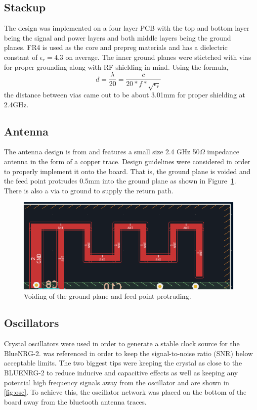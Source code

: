 \documentclass[12pt,journal,onecolumn,draftclsnofoot]{IEEEtran}
\begin{document}
\subsection{Stackup}
The design was implemented on a four layer PCB with the top and bottom layer being the signal and power layers and both middle layers being the ground planes. FR4 is used as the core and prepreg materials and has a dielectric constant of $\epsilon_r = 4.3$ on average. The inner ground planes were stictched with vias for proper grounding along with RF shielding in mind. Using the formula, \[d = \frac{\lambda}{20} = \frac{c}{20*f*\sqrt{\epsilon_r}}\] the distance between vias came out to be about 3.01mm for proper shielding at 2.4GHz.

\subsection{Antenna}
The antenna design is from \cite{an043} and features a small size 2.4 GHz 50$\Omega$ impedance antenna in the form of a copper trace. Design guidelines were considered in order to properly implement it onto the board. That is, the ground plane is voided and the feed point protrudes 0.5mm into the ground plane as shown in Figure~\ref{fig:ant}. There is also a via to ground to supply the return path.

\begin{figure}[H]
\centering
\includegraphics[]{Pics/ant.png}
\caption{Voiding of the ground plane and feed point protruding.} 
\label{fig:ant}
\end{figure}

\subsection{Oscillators}
Crystal oscillators were used in order to generate a stable clock source for the BlueNRG-2. \cite{an2867} was referenced in order to keep the signal-to-noise ratio (SNR) below acceptable limits. The two biggest tips were keeping the crystal as close to the BLUENRG-2 to reduce inducive and capacitive effects as well as keeping any potential high frequency signals away from the oscillator and are shown in \ref{fig:osc}. To achieve this, the oscillator network was placed on the bottom of the board away from the bluetooth antenna traces.
\end{document}
